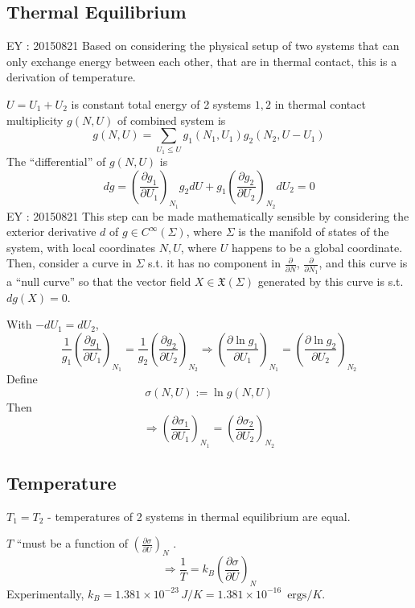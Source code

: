 \documentclass[twoside]{amsart}
\theoremstyle{plain}
\theoremstyle{definition}
\begin{document}
\subsection*{Thermal Equilibrium}

EY : 20150821 Based on considering the physical setup of two systems that can only exchange energy between each other, that are in thermal contact, this is a derivation of temperature.

$U = U_1 + U_2$ is constant total energy of 2 systems $1,2$ in thermal contact \\
multiplicity $g(N,U)$ of combined system is 
\[
g(N,U) = \sum_{U_1 \leq U} g_1(N_1,U_1)g_2(N_2,U-U_1)
\]
The ``differential'' of $g(N,U)$ is 
\[
dg = \left( \frac{\partial g_1}{ \partial U_1 } \right)_{N_1} g_2 dU + g_1\left( \frac{\partial g_2 }{ \partial U_2 } \right)_{N_2} dU_2 = 0 
\]
EY : 20150821 This step can be made mathematically sensible by considering the exterior derivative $d$ of $g \in C^{\infty}(\Sigma)$, where $\Sigma$ is the manifold of states of the system, with local coordinates $N,U$, where $U$ happens to be a global coordinate. Then, consider a curve in $\Sigma$ s.t. it has no component in $\frac{\partial}{ \partial N}$, $\frac{\partial}{ \partial N_1}$, and this curve is a ``null curve'' so that the vector field $X\in \mathfrak{X}(\Sigma)$ generated by this curve is s.t. $dg(X)=0$.  

With $-dU_1 = dU_2$,
\[
\frac{1}{g_1} \left( \frac{\partial g_1}{ \partial U_1}\right)_{N_1} = \frac{1}{g_2} \left( \frac{\partial g_2}{ \partial U_2} \right)_{N_2} \Longrightarrow \left( \frac{ \partial \ln{g_1} }{ \partial U_1} \right)_{N_1} = \left( \frac{ \partial \ln{g_2}}{ \partial U_2} \right)_{N_2}
\]
Define
\[
\sigma(N,U) := \ln{ g(N,U)}
\]
Then
\[
\Longrightarrow \left( \frac{ \partial \sigma_1}{ \partial U_1} \right)_{N_1} = \left( \frac{ \partial \sigma_2}{ \partial U_2} \right)_{N_2}
\]



\subsection*{Temperature}

$T_1=T_2$ - temperatures of 2 systems in thermal equilibrium are equal.  

$T$ ``must be a function of $ \left( \frac{ \partial \sigma}{ \partial U} \right)_N$ \cite{CKittleHKroemer}.  
\[
\Longrightarrow \frac{1}{T} = k_B \left( \frac{ \partial \sigma }{ \partial U} \right)_N
\]
Experimentally, $k_B = 1.381 \times 10^{-23} \, J/K = 1.381\times 10^{-16} \, \text{ ergs}/ K$.  
\end{document}
